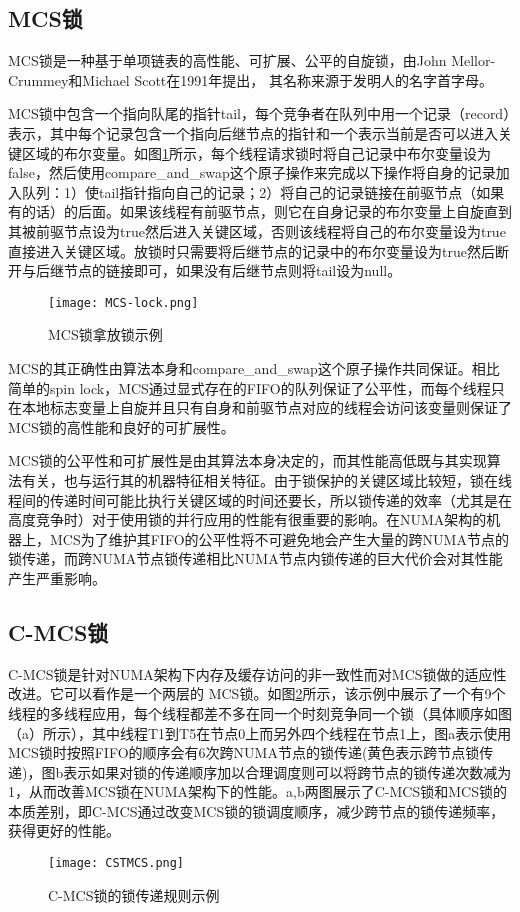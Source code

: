 \subsection{MCS锁}
MCS锁是一种基于单项链表的高性能、可扩展、公平的自旋锁，由John Mellor-Crummey和Michael Scott在1991年提出， 其名称来源于发明人的名字首字母。

MCS锁中包含一个指向队尾的指针tail，每个竞争者在队列中用一个记录（record）表示，其中每个记录包含一个指向后继节点的指针和一个表示当前是否可以进入关键区域的布尔变量。如图\ref{Fig:MCS}所示，每个线程请求锁时将自己记录中布尔变量设为false，然后使用compare\_and\_swap这个原子操作来完成以下操作将自身的记录加入队列：1）使tail指针指向自己的记录；2）将自己的记录链接在前驱节点（如果有的话）的后面。如果该线程有前驱节点，则它在自身记录的布尔变量上自旋直到其被前驱节点设为true然后进入关键区域，否则该线程将自己的布尔变量设为true直接进入关键区域。放锁时只需要将后继节点的记录中的布尔变量设为true然后断开与后继节点的链接即可，如果没有后继节点则将tail设为null。
\begin{figure}[t]
	\centering
	\texttt{[image: MCS-lock.png]}
	\caption{MCS锁拿放锁示例}
	\label{Fig:MCS}
\end{figure}

MCS的其正确性由算法本身和compare\_and\_swap这个原子操作共同保证。相比简单的spin lock，MCS通过显式存在的FIFO的队列保证了公平性，而每个线程只在本地标志变量上自旋并且只有自身和前驱节点对应的线程会访问该变量则保证了MCS锁的高性能和良好的可扩展性。

MCS锁的公平性和可扩展性是由其算法本身决定的，而其性能高低既与其实现算法有关，也与运行其的机器特征相关特征。由于锁保护的关键区域比较短，锁在线程间的传递时间可能比执行关键区域的时间还要长\cite{johnson2010decoupling}，所以锁传递的效率（尤其是在高度竞争时）对于使用锁的并行应用的性能有很重要的影响。在NUMA架构的机器上，MCS为了维护其FIFO的公平性将不可避免地会产生大量的跨NUMA节点的锁传递，而跨NUMA节点锁传递相比NUMA节点内锁传递的巨大代价会对其性能产生严重影响。

\subsection{C-MCS锁}
C-MCS锁是针对NUMA架构下内存及缓存访问的非一致性而对MCS锁做的适应性改进。它可以看作是一个两层的 MCS锁。如图\ref{Fig:CSTMCS}所示，该示例中展示了一个有9个线程的多线程应用，每个线程都差不多在同一个时刻竞争同一个锁（具体顺序如图（a）所示），其中线程T1到T5在节点0上而另外四个线程在节点1上，图a表示使用MCS锁时按照FIFO的顺序会有6次跨NUMA节点的锁传递(黄色表示跨节点锁传递)，图b表示如果对锁的传递顺序加以合理调度则可以将跨节点的锁传递次数减为1，从而改善MCS锁在NUMA架构下的性能。a,b两图展示了C-MCS锁和MCS锁的本质差别，即C-MCS通过改变MCS锁的锁调度顺序，减少跨节点的锁传递频率，获得更好的性能。
\begin{figure}[t]
	\centering
	\texttt{[image: CSTMCS.png]}
	\caption{C-MCS锁的锁传递规则示例}
	\label{Fig:CSTMCS}
\end{figure}

